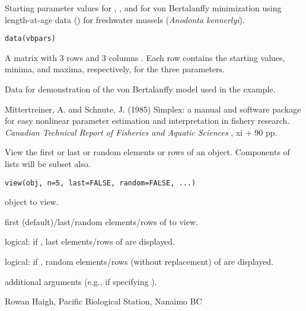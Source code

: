\documentclass[letterpaper]{book}
\begin{document}
\begin{Description}\relax
Starting parameter values for , , and  for 
von Bertalanffy minimization using length-at-age data () 
for freshwater mussels (\emph{Anodonta kennerlyi}).
\end{Description}
\begin{Usage}
\begin{verbatim}data(vbpars)\end{verbatim}
\end{Usage}
\begin{Format}\relax
A matrix with 3 rows and 3 columns . Each row contains 
the starting values, minima, and maxima, respectively, for the three parameters.
\end{Format}
\begin{Details}\relax
Data for demonstration of the von Bertalanffy model used in 
the  example.
\end{Details}
\begin{References}\relax
Mittertreiner, A. and Schnute, J. (1985) Simplex: a manual and software package 
for easy nonlinear parameter estimation and interpretation in fishery research. 
\emph{Canadian Technical Report of Fisheries and Aquatic Sciences} , xi + 90 pp.
\end{References}

\begin{Description}\relax
View the first or last or random  elements or rows of an object. 
Components of lists will be subset also.
\end{Description}
\begin{Usage}
\begin{verbatim}
view(obj, n=5, last=FALSE, random=FALSE, ...)
\end{verbatim}
\end{Usage}
\begin{Arguments}
\begin{ldescription}
\item[\code{obj}] object to view.
\item[\code{n}] first (default)/last/random  elements/rows of  to view.
\item[\code{last}] logical: if , last  elements/rows of  are displayed.
\item[\code{random}] logical: if ,  random elements/rows 
(without replacement) of  are displayed.
\item[\code{...}] additional arguments (e.g.,  if specifying ).
\end{ldescription}
\end{Arguments}
\begin{Author}\relax
Rowan Haigh, Pacific Biological Station, Nanaimo BC
\end{Author}
\end{document}
